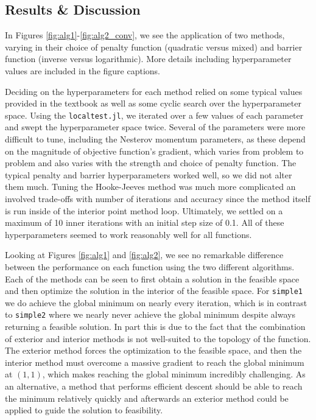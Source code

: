\documentclass[conference]{IEEEtran}
\begin{document}
\subsection{Results \& Discussion}

In Figures \ref{fig:alg1}-\ref{fig:alg2_conv}, we see the application of two methods, varying in their choice of penalty function (quadratic versus mixed) and barrier function (inverse versus logarithmic). More details including hyperparameter values are included in the figure captions.

Deciding on the hyperparameters for each method relied on some typical values provided in the textbook as well as some cyclic search over the hyperparameter space. Using the \texttt{localtest.jl}, we iterated over a few values of each parameter and swept the hyperparameter space twice. Several of the parameters were more difficult to tune, including the Nesterov momentum parameters, as these depend on the magnitude of objective function's gradient, which varies from problem to problem and also varies with the strength and choice of penalty function. The typical penalty and barrier hyperparameters worked well, so we did not alter them much. Tuning the Hooke-Jeeves method was much more complicated an involved trade-offs with number of iterations and accuracy since the method itself is run inside of the interior point method loop. Ultimately, we settled on a maximum of 10 inner iterations with an initial step size of 0.1. All of these hyperparameters seemed to work reasonably well for all functions.

Looking at Figures \ref{fig:alg1} and \ref{fig:alg2}, we see no remarkable difference between the performance on each function using the two different algorithms. Each of the methods can be seen to first obtain a solution in the feasible space and then optimize the solution in the interior of the feasible space. For \texttt{simple1} we do achieve the global minimum on nearly every iteration, which is in contrast to \texttt{simple2} where we nearly never achieve the global minimum despite always returning a feasible solution. In part this is due to the fact that the combination of exterior and interior methods is not well-suited to the topology of the function. The exterior method forces the optimization to the feasible space, and then the interior method must overcome a massive gradient to reach the global minimum at $(1,1)$, which makes reaching the global minimum incredibly challenging. As an alternative, a method that performs efficient descent should be able to reach the minimum relatively quickly and afterwards an exterior method could be applied to guide the solution to feasibility. 
\end{document}
